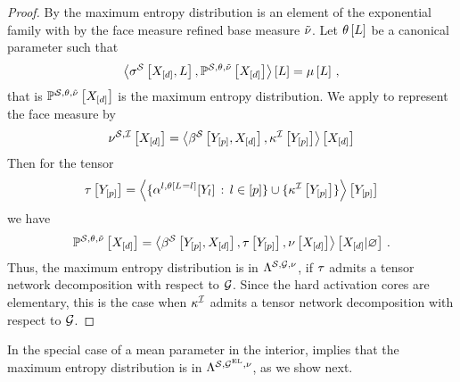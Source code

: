 \begin{proof}
    By  the maximum entropy distribution is an element of the exponential family with by the face measure refined base measure $\tilde{\nu}$.
    Let $\theta\left[L\right]$ be a canonical parameter such that
    \begin{align*}
        \left\langle \sigma^{\mathcal{S}}\left[X_{[d]},L\right],\mathbb{P}^{\mathcal{S},\theta,\tilde{\nu}}\left[X_{[d]}\right]\right\rangle \left[ L \right] = \mu\left[L\right] \, ,
    \end{align*}
    that is $\mathbb{P}^{\mathcal{S},\theta,\tilde{\nu}}\left[X_{[d]}\right]$ is the maximum entropy distribution.
    We apply  to represent the face measure by
    \begin{align*}
        \nu^{\mathcal{S},\mathcal{I}}\left[X_{[d]}\right] =
        \left\langle \beta^{\mathcal{S}}\left[Y_{[p]},X_{[d]}\right],\kappa^{\mathcal{I}}\left[Y_{[p]}\right]\right\rangle \left[ X_{[d]} \right]
    \end{align*}
    Then for the tensor
    \begin{align*}
        \tau\left[Y_{[p]}\right]
        = \left\langle 
            \{\alpha^{l,\theta\left[L_{}=l_{}\right]}[Y_{l}]\,:\,l\in[p]\}
            \cup\{\kappa^{\mathcal{I}}\left[Y_{[p]}\right]\}\right\rangle \left[ Y_{[p]} \right]
    \end{align*}
    we have
    \begin{align*}
        \mathbb{P}^{\mathcal{S},\theta,\tilde{\nu}}\left[X_{[d]}\right]
        = \left\langle 
            \beta^{\mathcal{S}}\left[Y_{[p]},X_{[d]}\right], \tau\left[Y_{[p]}\right], \nu\left[X_{[d]}\right]
        \right\rangle \left[ X_{[d]} | \varnothing \right] \, .
    \end{align*}
    Thus, the maximum entropy distribution is in $\Lambda^{\mathcal{S},\mathcal{G},\nu}$, if $\tau$ admits a tensor network decomposition with respect to $\mathcal{G}$.
    Since the hard activation cores are elementary, this is the case when $\kappa^{\mathcal{I}}$ admits a tensor network decomposition with respect to $\mathcal{G}$.
\end{proof}

In the special case of a mean parameter in the interior,  implies that the maximum entropy distribution is in $\Lambda^{\mathcal{S},\mathcal{G}^{\mathrm{EL}},\nu}$, as we show next.

